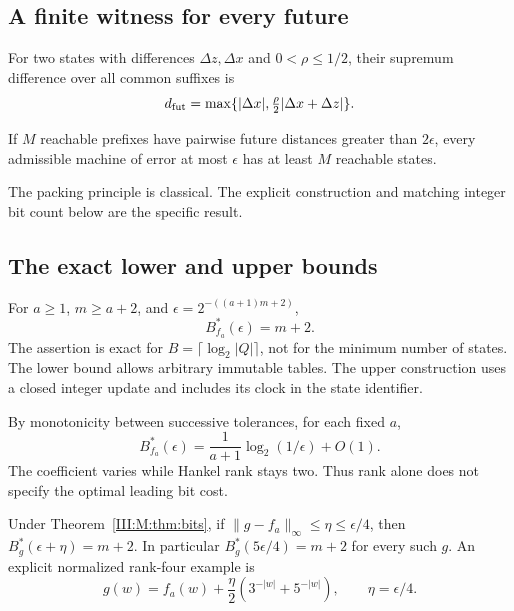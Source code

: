 \subsection{A finite witness for every future}
\begin{lemma}\label{III:M:lem:future}
For two states with differences $\Delta z,\Delta x$ and $0<\rho\le1/2$,
their supremum difference over all common suffixes is
\[
 d_{\rm fut}=\max\{|\Delta x|,\tfrac\rho2|\Delta x+\Delta z|\}.
\]
\end{lemma}


\begin{lemma}
If $M$ reachable prefixes have pairwise future distances greater than
$2\epsilon$, every admissible machine of error at most $\epsilon$
has at least $M$ reachable states.
\end{lemma}

The packing principle is classical. The explicit construction and matching
integer bit count below are the specific result.

\subsection{The exact lower and upper bounds}
\begin{theorem}\label{III:M:thm:bits}
For $a\ge1$, $m\ge a+2$, and $\epsilon=2^{-((a+1)m+2)}$,
\[
 \boxed{B_{f_a}^*(\epsilon)=m+2.}
\]
The assertion is exact for $B=\lceil\log_2|Q|\rceil$, not for the minimum number of states. The lower bound allows arbitrary immutable tables. The upper construction
uses a closed integer update and includes its clock in the state identifier.
\end{theorem}


By monotonicity between successive tolerances, for each fixed $a$,
\[
 B_{f_a}^*(\epsilon)=\frac1{a+1}\log_2(1/\epsilon)+O(1).
\]
The coefficient varies while Hankel rank stays two. Thus rank alone does
not specify the optimal leading bit cost.

\begin{corollary}\label{III:M:cor:robust-bits}
Under Theorem~\ref{III:M:thm:bits}, if $\|g-f_a\|_\infty\le\eta\le\epsilon/4$,
then $B_g^*(\epsilon+\eta)=m+2$. In particular
$B_g^*(5\epsilon/4)=m+2$ for every such $g$.
An explicit normalized rank-four example is
\[
 g(w)=f_a(w)+\frac\eta2(3^{-|w|}+5^{-|w|}),\qquad\eta=\epsilon/4.
\]
\end{corollary}


